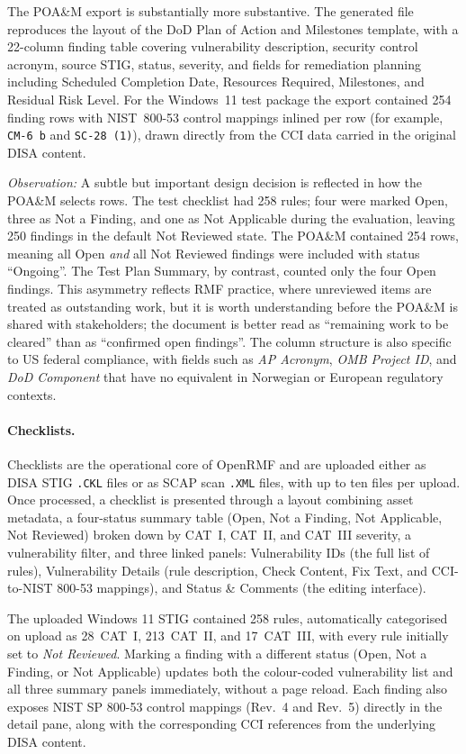 The POA\&M export is substantially more substantive. The generated file
reproduces the layout of the DoD Plan of Action and Milestones template,
with a 22-column finding table covering vulnerability description, security
control acronym, source STIG, status, severity, and fields for remediation
planning including Scheduled Completion Date, Resources Required, Milestones,
and Residual Risk Level. For the Windows~11 test package the export contained
254 finding rows with NIST~800-53 control mappings inlined per row
(for example, \texttt{CM-6 b} and \texttt{SC-28 (1)}), drawn directly from
the CCI data carried in the original DISA content.

\textit{Observation:} A subtle but important design decision is reflected in
how the POA\&M selects rows. The test checklist had 258 rules; four were
marked Open, three as Not a Finding, and one as Not Applicable during the
evaluation, leaving 250 findings in the default Not Reviewed state. The
POA\&M contained 254 rows, meaning all Open \textit{and} all Not Reviewed
findings were included with status ``Ongoing''. The Test Plan Summary, by
contrast, counted only the four Open findings. This asymmetry reflects
RMF practice, where unreviewed items are treated as outstanding work, but
it is worth understanding before the POA\&M is shared with stakeholders;
the document is better read as ``remaining work to be cleared'' than as
``confirmed open findings''. The column structure is also specific to US
federal compliance, with fields such as \textit{AP Acronym}, \textit{OMB
Project ID}, and \textit{DoD Component} that have no equivalent in
Norwegian or European regulatory contexts.

\paragraph{Checklists.}
Checklists are the operational core of OpenRMF and are uploaded either as
DISA STIG \texttt{.CKL} files or as SCAP scan \texttt{.XML} files, with up
to ten files per upload. Once processed, a checklist is presented through a
layout combining asset metadata, a four-status summary table (Open, Not a
Finding, Not Applicable, Not Reviewed) broken down by CAT~I, CAT~II, and
CAT~III severity, a vulnerability filter, and three linked panels:
Vulnerability IDs (the full list of rules), Vulnerability Details (rule
description, Check Content, Fix Text, and CCI-to-NIST 800-53 mappings), and
Status \& Comments (the editing interface).

The uploaded Windows 11 STIG contained 258 rules, automatically categorised
on upload as 28~CAT~I, 213~CAT~II, and 17~CAT~III, with every rule initially
set to \textit{Not Reviewed}. Marking a finding with a different status
(Open, Not a Finding, or Not Applicable) updates both the colour-coded
vulnerability list and all three summary panels immediately, without a page
reload. Each finding also exposes NIST SP 800-53 control mappings (Rev.~4
and Rev.~5) directly in the detail pane, along with the corresponding CCI
references from the underlying DISA content.


